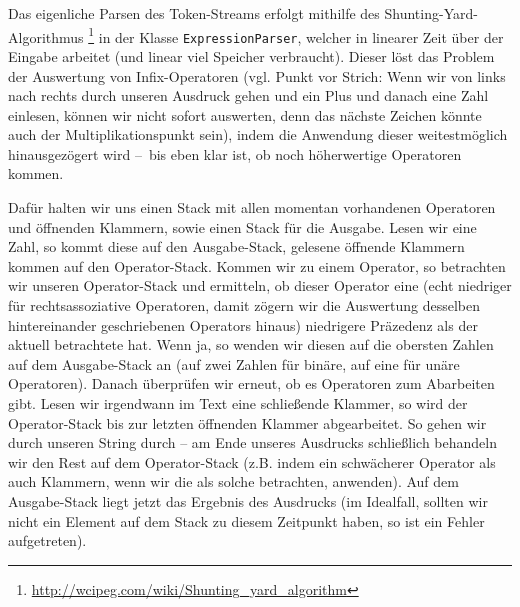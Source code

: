 Das eigenliche Parsen des Token-Streams erfolgt mithilfe des
Shunting-Yard-Algorithmus \footnote{\url{http://wcipeg.com/wiki/Shunting_yard_algorithm}} in
der Klasse \texttt{ExpressionParser}, welcher in linearer Zeit über der Eingabe
arbeitet (und linear viel Speicher verbraucht). Dieser löst das Problem der
Auswertung von Infix-Operatoren (vgl. Punkt vor Strich: Wenn wir von links nach
rechts durch unseren Ausdruck gehen und ein Plus und danach eine Zahl einlesen,
können wir nicht sofort auswerten, denn das nächste Zeichen könnte auch der
Multiplikationspunkt sein), indem die Anwendung dieser weitestmöglich
hinausgezögert wird – bis eben klar ist, ob noch höherwertige Operatoren kommen.

Dafür halten wir uns einen Stack mit allen momentan vorhandenen Operatoren und
öffnenden Klammern, sowie einen Stack für die Ausgabe. Lesen wir eine Zahl, so
kommt diese auf den Ausgabe-Stack, gelesene öffnende Klammern kommen auf den
Operator-Stack. Kommen wir zu einem Operator, so betrachten wir unseren
Operator-Stack und ermitteln, ob dieser Operator eine (echt niedriger für
rechtsassoziative Operatoren, damit zögern wir die Auswertung desselben
hintereinander geschriebenen Operators hinaus) niedrigere Präzedenz als der
aktuell betrachtete hat. Wenn ja, so wenden wir diesen auf die obersten Zahlen
auf dem Ausgabe-Stack an (auf zwei Zahlen für binäre, auf eine für unäre
Operatoren). Danach überprüfen wir erneut, ob es Operatoren zum Abarbeiten gibt.
Lesen wir irgendwann im Text eine schließende Klammer, so wird der
Operator-Stack bis zur letzten öffnenden Klammer abgearbeitet. So gehen wir
durch unseren String durch – am Ende unseres Ausdrucks schließlich behandeln wir
den Rest auf dem Operator-Stack (z.B. indem ein schwächerer Operator als auch
Klammern, wenn wir die als solche betrachten, anwenden). Auf dem Ausgabe-Stack
liegt jetzt das Ergebnis des Ausdrucks (im Idealfall, sollten wir nicht ein
Element auf dem Stack zu diesem Zeitpunkt haben, so ist ein Fehler aufgetreten).

